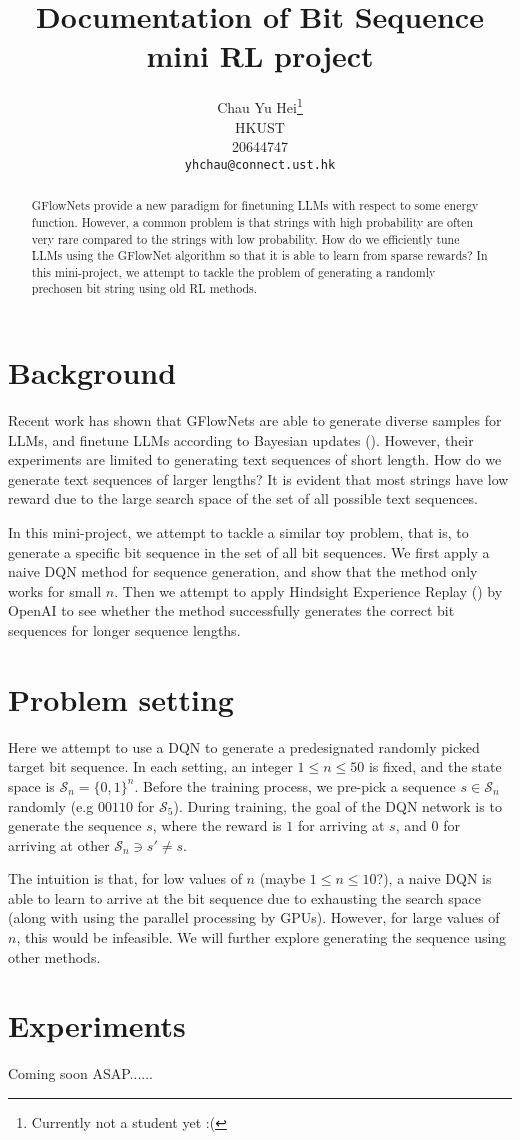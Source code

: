 \documentclass{article}
\title{Documentation of Bit Sequence mini RL project}
\author{%
  Chau Yu Hei\thanks{Currently not a student yet :(} \\
  HKUST\\
  20644747\\
  \texttt{yhchau@connect.ust.hk} \\
}
\begin{document}
\maketitle


\begin{abstract}
GFlowNets provide a new paradigm for finetuning LLMs with respect to some energy function. However, a common problem is that strings with high probability are often very rare compared to the strings with low probability. How do we efficiently tune LLMs using the GFlowNet algorithm so that it is able to learn from sparse rewards? In this mini-project, we attempt to tackle the problem of generating a randomly prechosen bit string using old RL methods.
\end{abstract}


\section{Background}
Recent work has shown that GFlowNets are able to generate diverse samples for LLMs, and finetune LLMs according to Bayesian updates (\cite{hu_llm}). However, their experiments are limited to generating text sequences of short length. How do we generate text sequences of larger lengths? It is evident that most strings have low reward due to the large search space of the set of all possible text sequences.

In this mini-project, we attempt to tackle a similar toy problem, that is, to generate a specific bit sequence in the set of all bit sequences. We first apply a naive DQN method for sequence generation, and show that the method only works for small $n$. Then we attempt to apply Hindsight Experience Replay (\cite{hindsight_openai}) by OpenAI to see whether the method successfully generates the correct bit sequences for longer sequence lengths.

\section{Problem setting}
Here we attempt to use a DQN to generate a predesignated randomly picked target bit sequence. In each setting, an integer $1 \leq n \leq 50$ is fixed, and the state space is $\mathcal{S}_n=\{0,1\}^n$. Before the training process, we pre-pick a sequence $s \in \mathcal{S}_n$ randomly (e.g $00110$ for $\mathcal{S}_5$). During training, the goal of the DQN network is to generate the sequence $s$, where the reward is $1$ for arriving at $s$, and $0$ for arriving at other $\mathcal{S}_n \ni s' \neq s$. 

The intuition is that, for low values of $n$ (maybe $1 \leq n \leq 10$?), a naive DQN is able to learn to arrive at the bit sequence due to exhausting the search space (along with using the parallel processing by GPUs). However, for large values of $n$, this would be infeasible. We will further explore generating the sequence using other methods.


\section{Experiments}
Coming soon ASAP......



\end{document}
